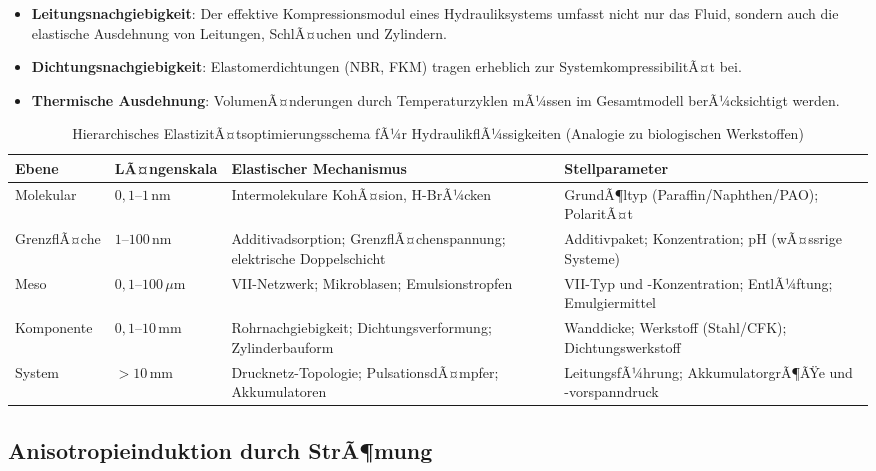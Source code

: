 ﻿\documentclass[a4paper,12pt]{scrreprt}
\theoremstyle{definition}
\begin{document}
\begin{itemize}
  \item \textbf{Leitungsnachgiebigkeit}: Der effektive Kompressionsmodul
    eines Hydrauliksystems umfasst nicht nur das Fluid, sondern auch die
    elastische Ausdehnung von Leitungen, SchlÃ¤uchen und Zylindern.
  \item \textbf{Dichtungsnachgiebigkeit}: Elastomerdichtungen (NBR, FKM)
    tragen erheblich zur SystemkompressibilitÃ¤t bei.
  \item \textbf{Thermische Ausdehnung}: VolumenÃ¤nderungen durch
    Temperaturzyklen mÃ¼ssen im Gesamtmodell berÃ¼cksichtigt werden.
\end{itemize}

\begin{table}[H]
  \centering
  \caption{Hierarchisches ElastizitÃ¤tsoptimierungsschema fÃ¼r HydraulikflÃ¼ssigkeiten
    (Analogie zu biologischen Werkstoffen)}
  \label{tab:hierarchie_hydraulik}
  \begin{tabular}{p{2.5cm}p{3.2cm}p{4.0cm}p{3.8cm}}
    \toprule
    \textbf{Ebene} & \textbf{LÃ¤ngenskala} & \textbf{Elastischer Mechanismus}
      & \textbf{Stellparameter} \\
    \midrule
    Molekular    & $0{,}1$--$1\,\mathrm{nm}$
      & Intermolekulare KohÃ¤sion, H-BrÃ¼cken
      & GrundÃ¶ltyp (Paraffin/Naphthen/PAO); PolaritÃ¤t \\
    \midrule
    GrenzflÃ¤che  & $1$--$100\,\mathrm{nm}$
      & Additivadsorption; GrenzflÃ¤chenspannung; elektrische Doppelschicht
      & Additivpaket; Konzentration; pH (wÃ¤ssrige Systeme) \\
    \midrule
    Meso         & $0{,}1$--$100\,\mu\mathrm{m}$
      & VII-Netzwerk; Mikroblasen; Emulsionstropfen
      & VII-Typ und -Konzentration; EntlÃ¼ftung; Emulgiermittel \\
    \midrule
    Komponente   & $0{,}1$--$10\,\mathrm{mm}$
      & Rohrnachgiebigkeit; Dichtungsverformung; Zylinderbauform
      & Wanddicke; Werkstoff (Stahl/CFK); Dichtungswerkstoff \\
    \midrule
    System       & $> 10\,\mathrm{mm}$
      & Drucknetz-Topologie; PulsationsdÃ¤mpfer; Akkumulatoren
      & LeitungsfÃ¼hrung; AkkumulatorgrÃ¶ÃŸe und -vorspanndruck \\
    \bottomrule
  \end{tabular}
\end{table}

\subsection{Anisotropieinduktion durch StrÃ¶mung}
\end{document}
